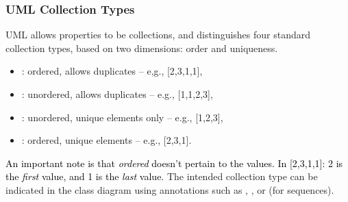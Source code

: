 \subsubsection{UML Collection Types}
UML allows properties to be collections, and distinguishes four standard collection types, based on two dimensions: order and uniqueness.
\begin{itemize}
    \item {}: ordered, allows duplicates -- e,g., [2,3,1,1],
    \item {}: unordered, allows duplicates -- e.g., [1,1,2,3], 
    \item {}: unordered, unique elements only -- e.g., [1,2,3], 
    \item {}:  ordered, unique elements -- e.g., [2,3,1]. 
\end{itemize}
\textcolor{black}{An important note is that \emph{ordered} doesn't pertain to the values.
In [2,3,1,1]: 2 is the \emph{first} value, and 1 is the \emph{last} value. 
}
The intended collection type can be indicated in the class diagram using annotations such as , , or  (for sequences).
